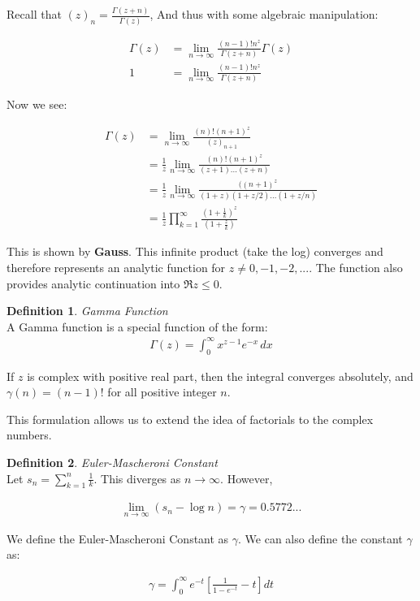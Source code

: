 \documentclass{article}
\theoremstyle{definition}
\newtheorem{definition}{Definition}[section]
\newcommand{\Def}[2]{
\begin{shaded*}
\begin{definition}{\textit{#1}}\\#2\end{definition}
\end{shaded*}
}
\begin{document}
Recall that $(z)_n = \frac{\Gamma(z+n)}{\Gamma(z)}$, And thus with some algebraic manipulation:

\begin{align*}
\Gamma(z) &= \lim_{n\to\infty}\frac{(n-1)!n^z}{\Gamma(z+n)}\Gamma(z) \\ 
1 &= \lim_{n\to\infty}\frac{(n-1)!n^z}{\Gamma(z+n)}
\end{align*}

Now we see:

\begin{align*}
\Gamma(z) &= \lim_{n\to\infty} \frac{(n)! (n+1)^z}{(z)_{n+1}} \\ 
 &= \frac{1}{z} \lim_{n\to\infty} \frac{(n)! (n+1)^z}{(z+1)...(z+n)} \\ 
  &= \frac{1}{z} \lim_{n\to\infty} \frac{((n+1)^z}{(1+z)(1+z/2)...(1+z/n)} \\ 
  &= \frac{1}{z} \prod_{k=1}^{\infty} \frac{(1+\frac{1}{k})^z}{(1+\frac{z}{k})}
\end{align*}

This is shown by \textbf{Gauss}. This infinite product (take the log) converges and therefore represents an analytic function for $z \neq 0, -1, -2,...$. The function also provides analytic continuation into $\Re{z} \leq 0$. 

\Def{Gamma Function}{
A Gamma function is a special function of the form:
\begin{align*}
\Gamma (z)=\int_{0}^{\infty}x^{z-1}e^{-x}\,dx
\end{align*}

If $z$ is complex with positive real part, then the integral converges absolutely, and $\gamma(n) = (n-1)!$ for all positive integer $n$.

This formulation allows us to extend the idea of factorials to the complex numbers.
}

\Def{Euler-Mascheroni Constant}{
Let $s_n = \sum_{k=1}^n \frac{1}{k}$. This diverges as $n\to\infty$. However, 

\begin{align*}
\lim_{n\to\infty}(s_n - \log n) = \gamma = 0.5772...
\end{align*} 

We define the Euler-Mascheroni Constant as $\gamma$. 
We can also define the constant $\gamma$ as:

\begin{align*}
\gamma =  \int_0^\infty e^{-t} \left[\frac{1}{1-e^{-t}}-t\right]dt
\end{align*}
}
\end{document}
